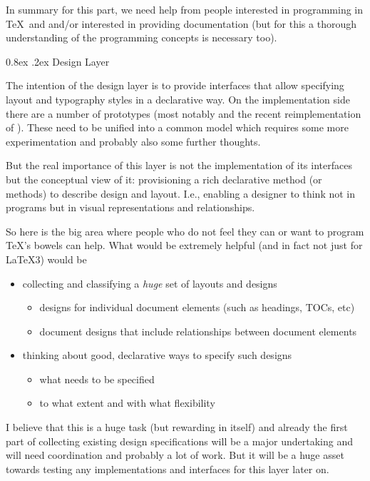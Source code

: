 \documentclass{ltnews}
\makeatletter
\newcommand{\@subheadingfont}{%
   \sffamily\slshape
   \let\LaTeX\cmssLaTeX\let\TeX\cmssTeX
}
\renewcommand{\subsection}{%
   \@startsection
      {subsection}{2}{\z@}{-1.3ex \@plus -1ex \@minus -.2ex}%
      {0.8ex \@plus.2ex}{\@subheadingfont}%
}
\makeatother
\begin{document}
In summary for this part, we need help from people interested in programming in \TeX\ and  and/or interested in providing documentation (but for this a thorough understanding of the programming concepts is necessary too).

\subsection{Design Layer}

The intention of the design layer is to provide interfaces that allow specifying layout and typography styles in a declarative way. On the implementation side there are a number of prototypes (most notably  and the recent reimplementation of ).
These need to be unified into a common model which requires some more experimentation and probably also some further thoughts.

But the real importance of this layer is not the implementation of its interfaces but the conceptual view of it: provisioning a rich declarative method (or methods) to describe design and layout. I.e., enabling a designer to think not in programs but in visual representations and relationships.

So here is the big area where people who do not feel they can or want to program \TeX's bowels can help. What would be extremely helpful (and in fact not just for \LaTeX3) would be
\begin{itemize}
\item collecting and classifying a \emph{huge} set of layouts and designs
\begin{itemize}[nosep]
\item designs for individual document elements (such as headings, TOCs, etc)
\item document designs that include relationships between document elements
\end{itemize}
\item thinking about good, declarative ways to specify such designs
\begin{itemize}[nosep]
\item what needs to be specified
\item to what extent and with what flexibility
\end{itemize}
\end{itemize}
I believe that this is a huge task (but rewarding in itself) and already the first part of collecting existing design specifications will be a major undertaking and will need coordination and probably a lot of work. But it will be a huge asset towards testing any implementations and interfaces for this layer later on.
\end{document}
